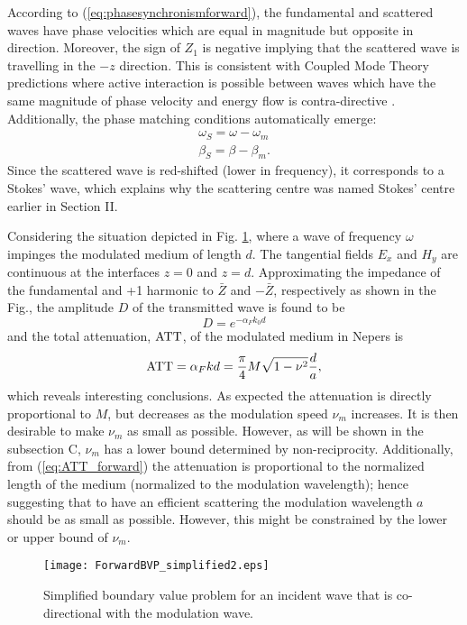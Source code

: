 \documentclass[journal]{IEEEtran}
\begin{document}
According to (\ref{eq:phasesynchronismforward}), the fundamental and scattered waves have phase velocities which are equal in magnitude but opposite in direction. Moreover, the sign of $Z_1$ is negative implying that the scattered wave is travelling in the $-z$ direction. This is consistent with Coupled Mode Theory predictions where active interaction is possible between waves which have the same magnitude of phase velocity and energy flow is contra-directive \cite{Pierce1954}. Additionally, the phase matching conditions automatically emerge:
\begin{eqnarray}
\label{eq:PM_forward}
\omega_S=\omega-\omega_m\\
\beta_S=\beta-\beta_m.
\end{eqnarray}
Since the scattered wave is red-shifted (lower in frequency), it corresponds to a Stokes' wave, which explains why the scattering centre was named Stokes' centre earlier in Section II.

Considering the situation depicted in Fig. \ref{fig:ForwardBVP_simplified}, where a wave of frequency $\omega$ impinges the modulated medium of length $d$.  The tangential fields $E_x$ and $H_y$ are continuous at the interfaces $z=0$ and $z=d$.  Approximating the impedance of the fundamental and +1 harmonic to $\bar{Z}$ and $-\bar{Z}$, respectively as shown in the Fig., the amplitude $D$ of the transmitted wave is found to be
\begin{equation}
D=e^{-\alpha_Fk_0d}
\end{equation}
and the total attenuation, $\textnormal{ATT}$, of the modulated medium in Nepers is
\begin{equation}
\label{eq:ATT_forward}
\textnormal{ATT}=\alpha_Fkd=\frac{\pi}{4}M\sqrt{1-\nu^2} \frac{d}{a},
\end{equation}
which reveals interesting conclusions. As expected the attenuation is directly proportional to $M$, but decreases as the modulation speed $\nu_m$ increases. It is then desirable to make $\nu_m$ as small as possible. However, as will be shown in the subsection C, $\nu_m$ has a lower bound determined by non-reciprocity. Additionally, from (\ref{eq:ATT_forward})  the attenuation is proportional to the normalized length of the medium (normalized to the modulation wavelength); hence suggesting that to have an efficient scattering the modulation wavelength $a$ should be as small as possible. However, this might be constrained by the lower or upper bound of $\nu_m$.
\begin{figure}
\centering
\texttt{[image: ForwardBVP\_simplified2.eps]}
\caption{Simplified boundary value problem for an incident wave that is co-directional with the modulation wave.}
\label{fig:ForwardBVP_simplified}
\end{figure}
\end{document}
